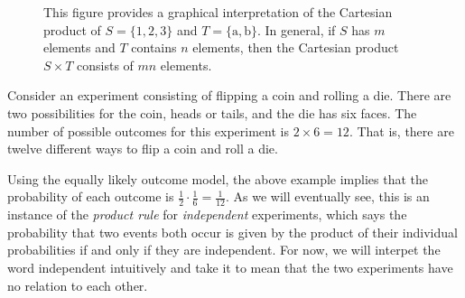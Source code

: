 \begin{figure}[htb!]
\begin{center}
\begin{footnotesize}
\end{footnotesize}
\caption{This figure provides a graphical interpretation of the Cartesian product of $S = \{ 1, 2, 3 \}$ and $T = \{ \mathrm{a}, \mathrm{b} \}$.
In general, if $S$ has $m$ elements and $T$ contains $n$ elements, then the Cartesian product $S \times T$ consists of $m n$ elements.}
\label{figure:CountingPrinciple}
\end{center}
\end{figure}

\begin{example}
Consider an experiment consisting of flipping a coin and rolling a die.
There are two possibilities for the coin, heads or tails, and the die has six faces.
The number of possible outcomes for this experiment is $2 \times 6 = 12$.
That is, there are twelve different ways to flip a coin and roll a die.
\end{example}

Using the equally likely outcome model, the above example implies that the probability of each outcome is $\frac{1}{2} \cdot \frac{1}{6} = \frac{1}{12}$.
As we will eventually see, this is an instance of the \emph{product rule} for \emph{independent} experiments, which says the probability that two events both occur is given by the product of their individual probabilities if and only if they are independent.
For now, we will interpet the word independent intuitively and take it to mean that the two experiments have no relation to each other.


